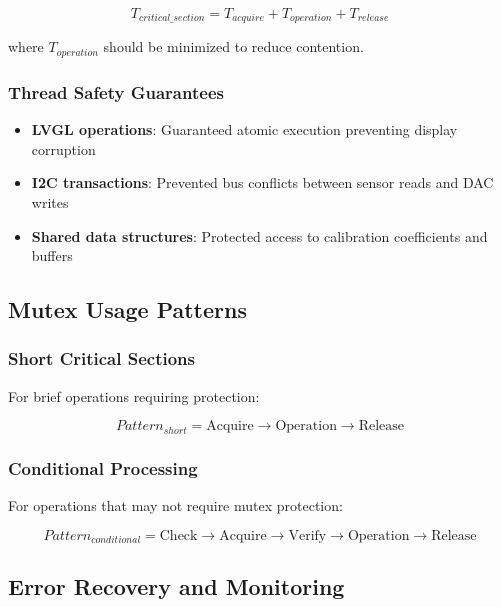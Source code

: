 \documentclass{article}
\begin{document}
\begin{equation}
T_{critical\_section} = T_{acquire} + T_{operation} + T_{release}
\end{equation}

where $T_{operation}$ should be minimized to reduce contention.

\subsubsection{Thread Safety Guarantees}

\begin{itemize}
    \item \textbf{LVGL operations}: Guaranteed atomic execution preventing display corruption
    \item \textbf{I2C transactions}: Prevented bus conflicts between sensor reads and DAC writes
    \item \textbf{Shared data structures}: Protected access to calibration coefficients and buffers
\end{itemize}

\subsection{Mutex Usage Patterns}


\subsubsection{Short Critical Sections}

For brief operations requiring protection:

\begin{equation}
Pattern_{short} = \text{Acquire} \rightarrow \text{Operation} \rightarrow \text{Release}
\end{equation}

\subsubsection{Conditional Processing}

For operations that may not require mutex protection:

\begin{equation}
Pattern_{conditional} = \text{Check} \rightarrow \text{Acquire} \rightarrow \text{Verify} \rightarrow \text{Operation} \rightarrow \text{Release}
\end{equation}

\subsection{Error Recovery and Monitoring}
\end{document}
